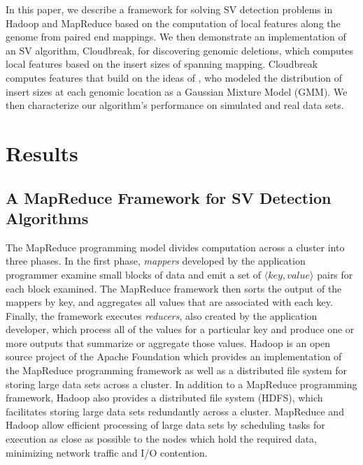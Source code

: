 \documentclass[11pt]{article}
\begin{document}
In this paper, we describe a framework for solving SV detection problems in Hadoop and MapReduce based on the computation of local features along the genome from paired end mappings. We then demonstrate an implementation of an SV algorithm, Cloudbreak, for discovering genomic deletions, which computes local features based on the insert sizes of spanning mapping. Cloudbreak computes features that build on the ideas of \autocite{Lee:2009da}, who modeled the distribution of insert sizes at each genomic location as a Gaussian Mixture Model (GMM). We then characterize our algorithm's performance on simulated and real data sets.

\section{Results}\label{results}

\subsection{A MapReduce Framework for SV Detection Algorithms}

The MapReduce programming model \autocite{Dean:2008p277} divides computation across a cluster into three phases. In the first phase, \emph{mappers} developed by the application programmer examine small blocks of data and emit a set of $\langle key, value \rangle$ pairs for each block examined. The MapReduce framework then sorts the output of the mappers by key, and aggregates all values that are associated with each key. Finally, the framework executes \emph{reducers}, also created by the application developer, which process all of the values for a particular key and produce one or more outputs that summarize or aggregate those values. Hadoop is an open source project of the Apache Foundation which provides an implementation of the MapReduce programming framework as well as a distributed file system for storing large data sets across a cluster. In addition to a MapReduce programming framework, Hadoop also provides a distributed file system (HDFS), which facilitates storing large data sets redundantly across a cluster. MapReduce and Hadoop allow efficient processing of large data sets by scheduling tasks for execution as close as possible to the nodes which hold the required data, minimizing network traffic and I/O contention.
\end{document}
